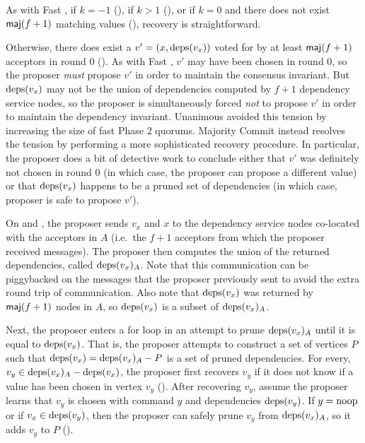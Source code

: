 {}

As with Fast \BPaxos{}, if $k = -1$ (), if $k
> 1$ (), or if $k = 0$ and there does not exist
$\textsf{maj}(f+1)$ matching values (), recovery is
straightforward.

Otherwise, there does exist a $v' = (x, \text{deps}(v_x))$ voted for by at least
$\textsf{maj}(f+1)$ acceptors in round $0$ (). As with Fast
\BPaxos{}, $v'$ may have been chosen in round $0$, so the proposer \emph{must}
propose $v'$ in order to maintain the consensus invariant. But $\text{deps}(v_x)$ may
not be the union of dependencies computed by $f+1$ dependency service nodes, so
the proposer is simultaneously forced \emph{not} to propose $v'$ in order to
maintain the dependency invariant. Unanimous \BPaxos{} avoided this tension by
increasing the size of fast Phase 2 quorums.  Majority Commit \BPaxos{} instead
resolves the tension by performing a more sophisticated recovery procedure.  In
particular, the proposer does a bit of detective work to conclude either that
$v'$ was definitely not chosen in round $0$ (in which case, the proposer can
propose a different value) or that $\text{deps}(v_x)$ happens to be a pruned set of
dependencies (in which case, proposer is safe to propose $v'$).

On  and
, the proposer sends $v_x$ and $x$ to
the dependency service nodes co-located with the acceptors in $A$ (i.e.\ the
$f+1$ acceptors from which the proposer received  messages).
The proposer then computes the union of the returned dependencies, called
$\text{deps}(v_x)_A$. Note that this communication can be piggybacked on the
 messages that the proposer previously sent to avoid the extra
round trip of communication.
%
Also note that $\text{deps}(v_x)$ was returned by $\textsf{maj}(f+1)$ nodes in $A$, so
$\text{deps}(v_x)$ is a subset of $\text{deps}(v_x)_A$.

Next, the proposer enters a for loop in an attempt to prune $\text{deps}(v_x)_A$
until it is equal to $\text{deps}(v_x)$. That is, the proposer attempts to construct
a set of vertices $P$ such that $\text{deps}(v_x) = \text{deps}(v_x)_A - P$ is a set of
pruned dependencies. For every, $v_y \in \text{deps}(v_x)_A - \text{deps}(v_x)$, the
proposer first recovers $v_y$ if it does not know if a value has been chosen in
vertex $v_y$ (). After recovering $v_y$, assume the
proposer learns that $v_y$ is chosen with command $y$ and dependencies
$\text{deps}(v_y)$. If $y = \text{noop}$ or if $v_x \in \text{deps}(v_y)$, then the proposer can
safely prune $v_y$ from $\text{deps}(v_x)_A$, so it adds $v_y$ to $P$
().

